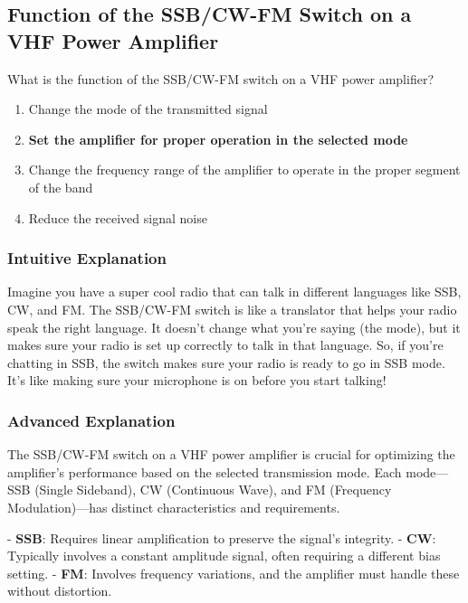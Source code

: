 \subsection{Function of the SSB/CW-FM Switch on a VHF Power Amplifier}
\label{T7A09}

\begin{tcolorbox}[colback=gray!10!white,colframe=black!75!black,title=T7A09]
What is the function of the SSB/CW-FM switch on a VHF power amplifier?
\begin{enumerate}[label=\Alph*]
    \item Change the mode of the transmitted signal
    \item \textbf{Set the amplifier for proper operation in the selected mode}
    \item Change the frequency range of the amplifier to operate in the proper segment of the band
    \item Reduce the received signal noise
\end{enumerate}
\end{tcolorbox}

\subsubsection{Intuitive Explanation}
Imagine you have a super cool radio that can talk in different languages like SSB, CW, and FM. The SSB/CW-FM switch is like a translator that helps your radio speak the right language. It doesn’t change what you’re saying (the mode), but it makes sure your radio is set up correctly to talk in that language. So, if you’re chatting in SSB, the switch makes sure your radio is ready to go in SSB mode. It’s like making sure your microphone is on before you start talking!

\subsubsection{Advanced Explanation}
The SSB/CW-FM switch on a VHF power amplifier is crucial for optimizing the amplifier's performance based on the selected transmission mode. Each mode—SSB (Single Sideband), CW (Continuous Wave), and FM (Frequency Modulation)—has distinct characteristics and requirements. 

- \textbf{SSB}: Requires linear amplification to preserve the signal's integrity.
- \textbf{CW}: Typically involves a constant amplitude signal, often requiring a different bias setting.
- \textbf{FM}: Involves frequency variations, and the amplifier must handle these without distortion.

